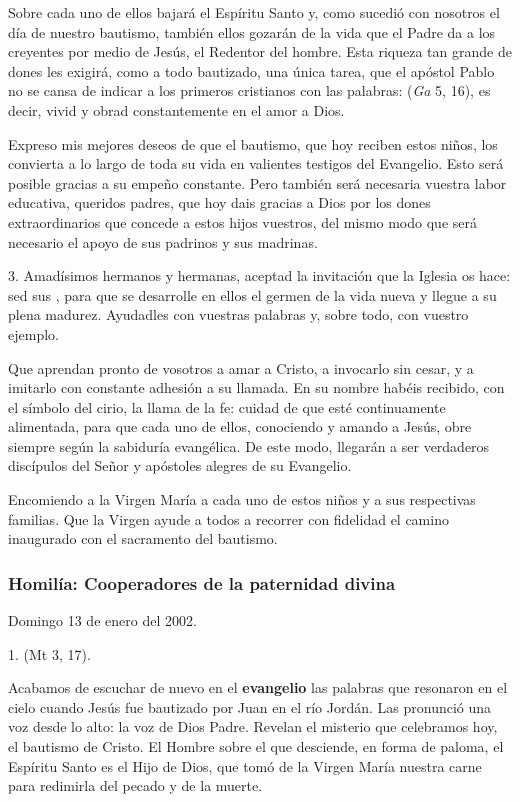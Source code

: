 \begin{body}
\begin{body}
{Sobre cada uno de ellos bajará el Espíritu Santo y, como sucedió con nosotros el día de nuestro bautismo, también ellos gozarán de la vida que el Padre da a los creyentes por medio de Jesús, el Redentor del hombre. Esta riqueza tan grande de dones les exigirá, como a todo bautizado, una única tarea, que el apóstol Pablo no se cansa de indicar a los primeros cristianos con las palabras:  (\emph{Ga} 5, 16), es decir, vivid y obrad constantemente en el amor a Dios.

Expreso mis mejores deseos de que el bautismo, que hoy reciben estos niños, los convierta a lo largo de toda su vida en valientes testigos del Evangelio. Esto será posible gracias a su empeño constante. Pero también será necesaria vuestra labor educativa, queridos padres, que hoy dais gracias a Dios por los dones extraordinarios que concede a estos hijos vuestros, del mismo modo que será necesario el apoyo de sus padrinos y sus madrinas.

3. Amadísimos hermanos y hermanas, aceptad la invitación que la Iglesia os hace: sed sus , para que se desarrolle en ellos el germen de la vida nueva y llegue a su plena madurez. Ayudadles con vuestras palabras y, sobre todo, con vuestro ejemplo.

Que aprendan pronto de vosotros a amar a Cristo, a invocarlo sin cesar, y a imitarlo con constante adhesión a su llamada. En su nombre habéis recibido, con el símbolo del cirio, la llama de la fe: cuidad de que esté continuamente alimentada, para que cada uno de ellos, conociendo y amando a Jesús, obre siempre según la sabiduría evangélica. De este modo, llegarán a ser verdaderos discípulos del Señor y apóstoles alegres de su Evangelio.

Encomiendo a la Virgen María a cada uno de estos niños y a sus respectivas familias. Que la Virgen ayude a todos a recorrer con fidelidad el camino inaugurado con el sacramento del bautismo.

\subsubsection{Homilía: Cooperadores de la paternidad divina}

Domingo 13 de enero del 2002.

1.  (Mt 3, 17).

Acabamos de escuchar de nuevo en el \textbf{evangelio} las palabras que resonaron en el cielo cuando Jesús fue bautizado por Juan en el río Jordán. Las pronunció una voz desde lo alto: la voz de Dios Padre. Revelan el misterio que celebramos hoy, el bautismo de Cristo. El Hombre sobre el que desciende, en forma de paloma, el Espíritu Santo es el Hijo de Dios, que tomó de la Virgen María nuestra carne para redimirla del pecado y de la muerte.

}
\end{body}
\end{body}
